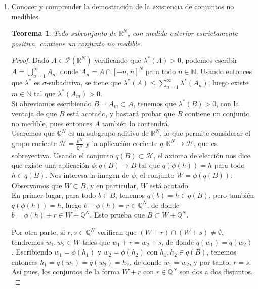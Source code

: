 \documentclass[a4paper, 12pt]{article}
\newtheorem{teorema}{Teorema}
\begin{document}
\begin{enumerate}[label=\textbf{\arabic*}.]
\begin{enumerate}[label=\textit{\alph*})]
\end{enumerate}

\bigskip

	\item Conocer y comprender la demostración de la existencia de conjuntos no medibles.
	
	\begin{teorema}
	Todo subconjunto de \(\mathbb{R}^N\), con medida exterior estrictamente positiva, contiene un conjunto no medible.
	\end{teorema}
	
	\begin{proof}
	Dado \(A \in \mathcal{P} (\mathbb{R}^N)\) verificando que \(\lambda^*(A) > 0\), podemos escribir \(A = \bigcup_{n=1}^{\infty} A_n\), donde \(A_n = A \cap [-n,n]^N\) para todo \(n \in \mathbb{N}\). Usando entonces que \(\lambda^*\) es \(\sigma\)-subaditiva, se tiene que \(\lambda^* (A) \leq \sum_{n=1}^{\infty} \lambda^*(A_n)\), luego existe \(m \in \mathbb{N}\) tal que \(\lambda^* (A_m) > 0\). \\
	
	Si abreviamos escribiendo \(B = A_m \subset A\), tenemos que \(\lambda^* (B) > 0\), con la ventaja de que \(B\) está acotado, y bastará probar que \(B\) contiene un conjunto no medible, pues entonces \(A\) también lo contendrá. \\
	
	Usaremos que \(\mathbb{Q}^N\) es un subgrupo aditivo de \(\mathbb{R}^N\), lo que permite considerar el grupo cociente \(\mathcal{H} = \frac{\mathbb{R}^N}{\mathbb{Q}^N}\) y la aplicación cociente \(q : \mathbb{R}^N \to \mathcal{H}\), que es sobreyectiva. Usando el conjunto \(q (B) \subset \mathcal{H}\), el axioma de elección nos dice que existe una aplicación \(\phi : q(B) \to B\) tal que \(q(\phi (h)) = h\) para todo \(h \in q (B)\). Nos interesa la imagen de \(\phi\), el conjunto \(W = \phi(q(B))\). Observamos que \(W \subset B\), y en particular, \(W\) está acotado. \\
	
	En primer lugar, para todo \(b \in B\), tenemos \(q(b) = h \in q (B)\), pero también \(q(\phi (h)) = h\), luego \(b - \phi (h) = r \in \mathbb{Q}^N\), de donde \(b = \phi (h) + r \in W + \mathbb{Q}^N\). Esto prueba que \(B \subset W + \mathbb{Q}^N\).
	
	Por otra parte, si \(r,s \in \mathbb{Q}^N\) verifican que \((W+r) \cap (W+s) \neq \emptyset\), tendremos \(w_1, w_2 \in W\) tales que \(w_1 + r = w_2 +s\), de donde \(q(w_1) = q(w_2)\). Escribiendo \(w_1 = \phi (h_1)\) y \(w_2 = \phi (h_2)\) con \(h_1, h_2 \in q (B)\), tenemos entonces \(h_1 = q(w_1) = q(w_2) = h_2\), de donde \(w_1 = w_2\), y por tanto, \(r = s\). Así pues, los conjuntos de la forma \(W + r\) con \(r \in \mathbb{Q}^N\) son dos a dos disjuntos. \\
	

\end{proof}
\end{enumerate}
\end{document}
